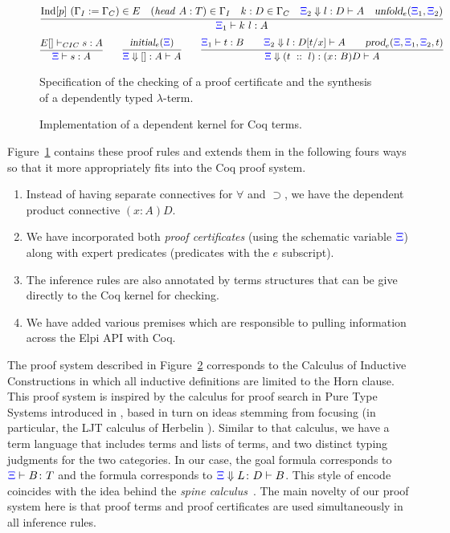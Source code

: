 \begin{figure}[t]
\[
\infer{\XXi_1\vdash k\ l : A}
      { \mathrm{Ind}[p] \ (\Gamma_I := \Gamma_C) \in E\quad 
       (\mathit{head} \ A : T)\in \Gamma_I\quad  
       k : D \in \Gamma_C\quad 
       \bc{\XXi_2}{} l D A \quad\unfoldExpert{\XXi_1}{\XXi_2}} 
\]
\vskip -18pt
\[
  \infer{\XXi\vdash  s : A}{{E[] \vdash_{CIC} s : A}}%
  \qquad
  \infer{\bc{\XXi}{}{[]} A A}{\initLExpert{\XXi}}
  \qquad
  \infer{\bc{\XXi}{}{(t\ ::\ l)}{\depprod{x}{B}{D}}{A}}
        {\XXi_1\vdash t : B\qquad
         \bc{\XXi_2}{}l {D[t/x]} A\qquad
         \prodE{\XXi}{\XXi_1}{\XXi_2}{t}}
\]
\caption{Specification of the checking of a proof certificate and the
  synthesis of a dependently typed $\lambda$-term.}
\label{fig:augmented}
\end{figure}

\begin{figure}


\caption{Implementation of a  dependent kernel for Coq terms.}
\label{fig:kernel}
\end{figure}

Figure~\ref{fig:augmented} contains these proof rules and extends them
in the following fours ways so that it more appropriately fits into
the Coq proof system.
\begin{enumerate}
  \item Instead of having separate connectives for $\forall$ and
    $\supset$, we have the dependent product connective $(x:A)D$. 
  \item We have incorporated both \emph{proof certificates} (using the
    schematic variable ${\color{blue}{\Xi}}$) along with expert predicates
    (predicates with the $e$ subscript).
  \item The inference rules are also annotated by terms structures that
    can be give directly to the Coq kernel for checking.
  \item We have added various premises which are responsible to
    pulling information across the Elpi API with Coq.
\end{enumerate}
The proof system described in Figure~\ref{fig:kernel} corresponds to
the Calculus of Inductive Constructions in which all inductive
definitions are limited to the Horn clause.
%
This proof system is inspired by the calculus for proof search in
Pure Type Systems introduced in \cite{LengrandDM06}, based in turn on
ideas stemming from focusing (in particular, the LJT calculus of
Herbelin \cite{Herbelin94}). Similar to that calculus, we have a
term language that includes terms and lists of terms, and two distinct
typing judgments for the two categories.
%
In our case, the \lP goal formula 
corresponds to ${\color{blue}{\Xi}}\vdash B \colon T$ and the formula
%
 corresponds to ${\color{blue}{\Xi}}\Downarrow L\colon
D\vdash B$.
%
This style of encode coincides with the idea behind the \emph{spine
  calculus}~\cite{Cervesato97tr}.  The main novelty of our proof
system here is that proof terms and proof certificates are used
simultaneously in all inference rules.

